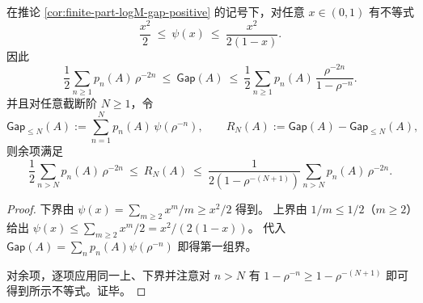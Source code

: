 \begin{proposition}\label{prop:finite-part-logM-gap-truncation-bounds}
在推论 \ref{cor:finite-part-logM-gap-positive} 的记号下，对任意 \(x\in(0,1)\) 有不等式
\[
\frac{x^2}{2}\ \le\ \psi(x)\ \le\ \frac{x^2}{2(1-x)}.
\]
因此
\[
\frac12\sum_{n\ge 1}p_n(A)\,\rho^{-2n}
\ \le\ \mathsf{Gap}(A)\ \le\
\frac12\sum_{n\ge 1}p_n(A)\,\frac{\rho^{-2n}}{1-\rho^{-n}}.
\]
并且对任意截断阶 \(N\ge 1\)，令
\[
\mathsf{Gap}_{\le N}(A):=\sum_{n=1}^{N}p_n(A)\,\psi(\rho^{-n}),
\qquad
R_N(A):=\mathsf{Gap}(A)-\mathsf{Gap}_{\le N}(A),
\]
则余项满足
\[
\frac12\sum_{n>N}p_n(A)\,\rho^{-2n}
\ \le\ R_N(A)\ \le\
\frac{1}{2(1-\rho^{-(N+1)})}\sum_{n>N}p_n(A)\,\rho^{-2n}.
\]
\leanverified{psi\_le\_weak}
\end{proposition}
\begin{proof}
下界由 \(\psi(x)=\sum_{m\ge 2}x^m/m\ge x^2/2\) 得到。
上界由 \(1/m\le 1/2\)（\(m\ge 2\)）给出
\(
\psi(x)\le \sum_{m\ge 2}x^m/2=x^2/(2(1-x))
\)。
代入 \(\mathsf{Gap}(A)=\sum_n p_n(A)\psi(\rho^{-n})\) 即得第一组界。
\par
对余项，逐项应用同一上、下界并注意对 \(n>N\) 有
\(
1-\rho^{-n}\ge 1-\rho^{-(N+1)}
\)
即可得到所示不等式。证毕。
\end{proof}

\endinput
